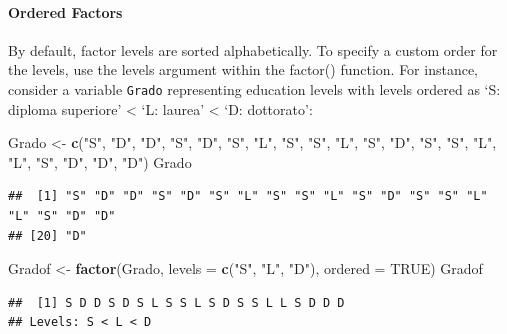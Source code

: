 \documentclass[
]{article}
\newenvironment{Shaded}{\begin{snugshade}}{\end{snugshade}}
\newcommand{\AttributeTok}[1]{\textcolor[rgb]{0.13,0.29,0.53}{#1}}
\newcommand{\ConstantTok}[1]{\textcolor[rgb]{0.56,0.35,0.01}{#1}}
\newcommand{\FunctionTok}[1]{\textcolor[rgb]{0.13,0.29,0.53}{\textbf{#1}}}
\newcommand{\NormalTok}[1]{#1}
\newcommand{\OtherTok}[1]{\textcolor[rgb]{0.56,0.35,0.01}{#1}}
\newcommand{\StringTok}[1]{\textcolor[rgb]{0.31,0.60,0.02}{#1}}
\begin{document}
\hypertarget{ordered-factors}{%
\paragraph{Ordered Factors}\label{ordered-factors}}

By default, factor levels are sorted alphabetically. To specify a custom
order for the levels, use the levels argument within the factor()
function. For instance, consider a variable \texttt{Grado} representing
education levels with levels ordered as `S: diploma superiore'
\textless{} `L: laurea' \textless{} `D: dottorato':

\begin{Shaded}
\begin{Highlighting}[]
\NormalTok{Grado }\OtherTok{\textless{}{-}} \FunctionTok{c}\NormalTok{(}\StringTok{"S"}\NormalTok{, }\StringTok{"D"}\NormalTok{, }\StringTok{"D"}\NormalTok{, }\StringTok{"S"}\NormalTok{, }\StringTok{"D"}\NormalTok{, }\StringTok{"S"}\NormalTok{, }\StringTok{"L"}\NormalTok{, }\StringTok{"S"}\NormalTok{, }\StringTok{"S"}\NormalTok{, }\StringTok{"L"}\NormalTok{, }
           \StringTok{"S"}\NormalTok{, }\StringTok{"D"}\NormalTok{, }\StringTok{"S"}\NormalTok{, }\StringTok{"S"}\NormalTok{, }\StringTok{"L"}\NormalTok{, }\StringTok{"L"}\NormalTok{, }\StringTok{"S"}\NormalTok{, }\StringTok{"D"}\NormalTok{, }\StringTok{"D"}\NormalTok{, }\StringTok{"D"}\NormalTok{)}
\NormalTok{Grado}
\end{Highlighting}
\end{Shaded}

\begin{verbatim}
##  [1] "S" "D" "D" "S" "D" "S" "L" "S" "S" "L" "S" "D" "S" "S" "L" "L" "S" "D" "D"
## [20] "D"
\end{verbatim}

\begin{Shaded}
\begin{Highlighting}[]
\NormalTok{Gradof }\OtherTok{\textless{}{-}} \FunctionTok{factor}\NormalTok{(Grado, }\AttributeTok{levels =} \FunctionTok{c}\NormalTok{(}\StringTok{"S"}\NormalTok{, }\StringTok{"L"}\NormalTok{, }\StringTok{"D"}\NormalTok{), }\AttributeTok{ordered =} \ConstantTok{TRUE}\NormalTok{)}
\NormalTok{Gradof}
\end{Highlighting}
\end{Shaded}

\begin{verbatim}
##  [1] S D D S D S L S S L S D S S L L S D D D
## Levels: S < L < D
\end{verbatim}
\end{document}
